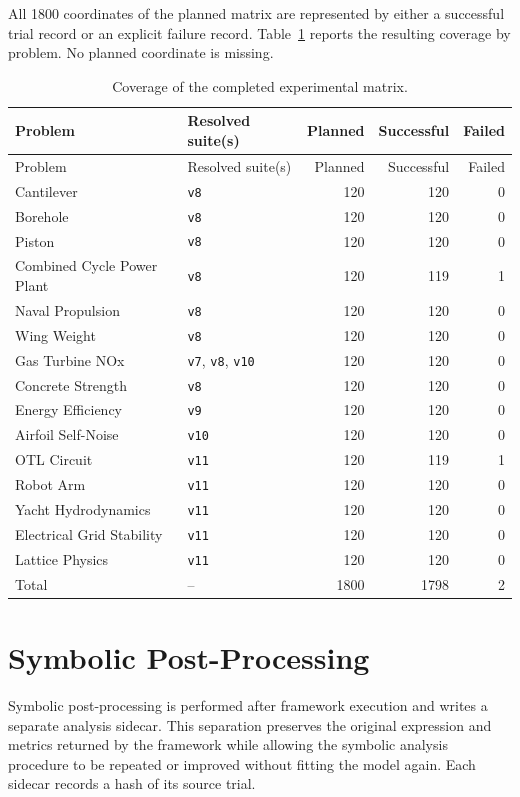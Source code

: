 \documentclass[12pt,oneside,bibtotoc,liststotoc]{scrbook}
\begin{document}
All 1800 coordinates of the planned matrix are represented by either a successful trial record or an explicit failure record. Table~\ref{tab:trial-coverage} reports the resulting coverage by problem. No planned coordinate is missing.

\begin{longtable}{p{3.8cm}p{3.2cm}rrr}
\caption{Coverage of the completed experimental matrix.}
\label{tab:trial-coverage}\\
\hline
Problem & Resolved suite(s) & Planned & Successful & Failed \\
\hline
\endfirsthead
\hline
Problem & Resolved suite(s) & Planned & Successful & Failed \\
\hline
\endhead
Cantilever & \texttt{v8} & 120 & 120 & 0 \\
Borehole & \texttt{v8} & 120 & 120 & 0 \\
Piston & \texttt{v8} & 120 & 120 & 0 \\
Combined Cycle Power Plant & \texttt{v8} & 120 & 119 & 1 \\
Naval Propulsion & \texttt{v8} & 120 & 120 & 0 \\
Wing Weight & \texttt{v8} & 120 & 120 & 0 \\
Gas Turbine NOx & \texttt{v7}, \texttt{v8}, \texttt{v10} & 120 & 120 & 0 \\
Concrete Strength & \texttt{v8} & 120 & 120 & 0 \\
Energy Efficiency & \texttt{v9} & 120 & 120 & 0 \\
Airfoil Self-Noise & \texttt{v10} & 120 & 120 & 0 \\
OTL Circuit & \texttt{v11} & 120 & 119 & 1 \\
Robot Arm & \texttt{v11} & 120 & 120 & 0 \\
Yacht Hydrodynamics & \texttt{v11} & 120 & 120 & 0 \\
Electrical Grid Stability & \texttt{v11} & 120 & 120 & 0 \\
Lattice Physics & \texttt{v11} & 120 & 120 & 0 \\
\hline
Total & -- & 1800 & 1798 & 2 \\
\hline
\end{longtable}

\section{Symbolic Post-Processing}

Symbolic post-processing is performed after framework execution and writes a separate analysis sidecar. This separation preserves the original expression and metrics returned by the framework while allowing the symbolic analysis procedure to be repeated or improved without fitting the model again. Each sidecar records a hash of its source trial.
\end{document}
